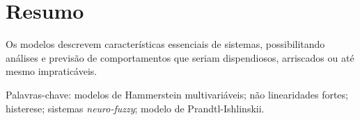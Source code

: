 \chapter*{Resumo}
\thispagestyle{empty}

\noindent Os modelos descrevem características essenciais de sistemas, possibilitando análises e previsão de comportamentos que seriam dispendiosos, arriscados ou até mesmo impraticáveis. 
\par 
\noindent Palavras-chave: modelos de Hammerstein multivariáveis; não linearidades fortes; histerese; sistemas \textit{neuro-fuzzy}; modelo de Prandtl-Ishlinskii.

